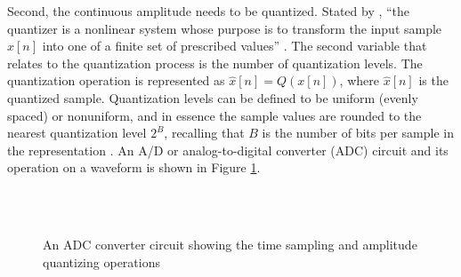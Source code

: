 \documentclass[report.tex]{subfiles}
\begin{document}
Second, the continuous amplitude needs to be quantized. Stated by \citeauthor{discretebook}, ``the quantizer is a nonlinear system whose purpose is to transform the input sample $x[n]$ into one of a finite set of prescribed values'' \parencite[190]{discretebook}. The second variable that relates to the quantization process is the number of quantization levels. The quantization operation is represented as $ \hat{x}[n] = Q(x[n])$, where $\hat{x}[n]$ is the quantized sample. Quantization levels can be defined to be uniform (evenly spaced) or nonuniform, and in essence the sample values are rounded to the nearest quantization level $2^{B}$, recalling that $B$ is the number of bits per sample in the representation \parencite{discretebook}. An A/D or analog-to-digital converter (ADC) circuit and its operation on a waveform is shown in Figure \ref{fig:adccircuit}.

\begin{figure}[ht]
	\centering
	\hspace{0.1em}
	\\
	\vspace{0.1em}
	\\
	\caption{An ADC converter circuit showing the time sampling and amplitude quantizing operations \parencite[188, 190, 192]{discretebook}}
	\label{fig:adccircuit}
\end{figure}
\end{document}
